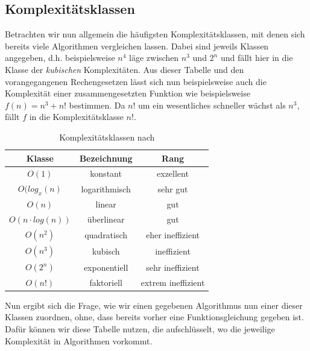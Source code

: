 \documentclass[11pt,a4paper]{scrartcl}
\begin{document}
\subsection{Komplexitätsklassen}
Betrachten wir nun allgemein die häufigsten Komplexitätsklassen, mit denen sich bereits viele Algorithmen vergleichen lassen. Dabei sind jeweils Klassen angegeben, d.h. beispielsweise $n^4$ läge zwischen $n^3$ und $2^n$ und fällt hier in die Klasse der \textit{kubischen} Komplexitäten. Aus dieser Tabelle und den vorangegangenen Rechengesetzen lässt sich nun beispielsweise auch die Komplexität einer zusammengesetzten Funktion wie beispielsweise $f(n) = n^3 + n!$ bestimmen. Da $n!$ um ein wesentliches schneller wächst als $n^3$, fällt $f$ in die Komplexitätsklasse $n!$. 
\label{kmplxtab}
\begin{table}[h!]
\centering
\begin{tabular}{|c|c|c|}
\hline
Klasse & Bezeichnung & Rang \\
\hline
$O(1)$ & konstant & exzellent \\
$O(log_x(n)$ & logarithmisch & sehr gut \\
$O(n)$ & linear & gut \\
$O(n \cdot log(n))$ & überlinear & gut \\
$O(n^2)$ & quadratisch & eher ineffizient \\
$O(n^3)$ & kubisch & ineffizient \\
$O(2^n)$ & exponentiell & sehr ineffizient \\
$O(n!)$ & faktoriell & extrem ineffizient \\
\hline
\end{tabular}
\caption{Komplexitätsklassen nach \parencite{Grundkurs}}
\end{table}
Nun ergibt sich die Frage, wie wir einen gegebenen Algorithmus nun einer dieser Klassen zuordnen, ohne, dass bereits vorher eine Funktionsgleichung gegeben ist. Dafür können wir diese Tabelle nutzen, die aufschlüsselt, wo die jeweilige Komplexität in Algorithmen vorkommt.
\end{document}
